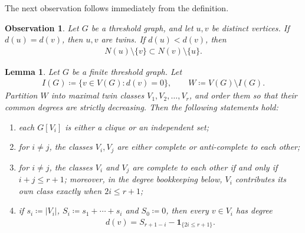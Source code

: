 \documentclass[10pt,a4paper]{article}
\newtheorem{lemma}[definition]{Lemma}
\newtheorem{observation}[definition]{Observation}
\newcommand{\ind}{\mathbf 1}
\begin{document}
The next observation follows immediately from the definition.

\begin{observation}\label{prop:threshold-equal-degree}
Let $G$ be a threshold graph, and let $u,v$ be distinct vertices.  If
$d(u)=d(v)$, then $u, v$ are twins. If
$d(u)<d(v)$, then
\begin{align*}
  N(u)\setminus\{v\}\subset N(v)\setminus\{u\}.
\end{align*}
\end{observation}




\begin{lemma}\label{prop:threshold-classes}
    Let $G$ be a finite threshold graph.  Let
    \begin{align*}
      I(G)\coloneqq\{v\in V(G):d(v)=0\},\qquad W\coloneqq V(G)\setminus I(G).
    \end{align*}
    Partition $W$ into maximal twin classes $V_1,V_2,\ldots,V_r$, and order them so that their common degrees are  strictly decreasing. 
    Then the following statements hold:
    \begin{enumerate}[label=\textup{(\roman*)}]
        \item each $G[V_i]$ is either a clique or an independent set;
        \item for $i\ne j$, the classes $V_i,V_j$ are either complete or anti-complete to each other;
        \item for $i\ne j$, the classes $V_i$ and $V_j$ are complete to each other if and only if $i+j\le r+1$; moreover, in the degree bookkeeping below, $V_i$ contributes its own class exactly when $2i\le r+1$;
        \item if $s_i\coloneqq|V_i|$, $S_i\coloneqq s_1+\cdots+s_i$ and $S_0\coloneqq 0$, then every $v\in V_i$ has degree
        \begin{align}\label{eq:threshold-degree}
          d(v)=S_{r+1-i}-\ind_{\{2i\le r+1\}}.
        \end{align}
    \end{enumerate}
\end{lemma}
\end{document}
